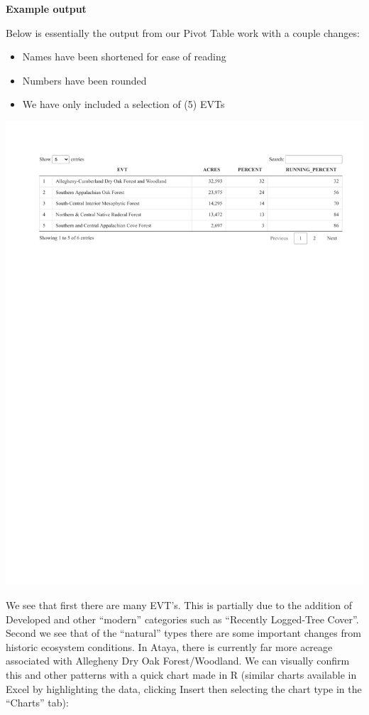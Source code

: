 \documentclass[
]{book}
\providecommand{\tightlist}{%
  \setlength{\itemsep}{0pt}\setlength{\parskip}{0pt}}
\begin{document}
\textbf{Example output}

Below is essentially the output from our Pivot Table work with a couple changes:

\begin{itemize}
\tightlist
\item
  Names have been shortened for ease of reading
\item
  Numbers have been rounded
\item
  We have only included a selection of (5) EVTs
\end{itemize}

\includegraphics{FSCBook_files/figure-latex/evtDT-1.pdf}

We see that first there are many EVT's. This is partially due to the addition of Developed and other ``modern'' categories such as ``Recently Logged-Tree Cover''. Second we see that of the ``natural'' types there are some important changes from historic ecosystem conditions. In Ataya, there is currently far more acreage associated with Allegheny Dry Oak Forest/Woodland. We can visually confirm this and other patterns with a quick chart made in R (similar charts available in Excel by highlighting the data, clicking Insert then selecting the chart type in the ``Charts'' tab):
\end{document}
